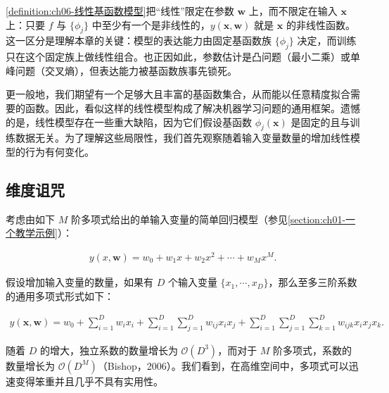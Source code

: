 \documentclass[../../main.tex]{subfiles}
\begin{document}
\begin{remark}\cref{definition:ch06-线性基函数模型}把“线性”限定在参数 $\boldsymbol{w}$ 上，而不限定在输入 $\boldsymbol{x}$ 上：只要 $f$ 与 $\{\phi_j\}$ 中至少有一个是非线性的，$y(\boldsymbol{x},\boldsymbol{w})$ 就是 $\boldsymbol{x}$ 的非线性函数。这一区分是理解本章的关键：模型的表达能力由固定基函数族 $\{\phi_j\}$ 决定，而训练只在这个固定族上做线性组合。也正因如此，参数估计是凸问题（最小二乘）或单峰问题（交叉熵），但表达能力被基函数族事先锁死。
\end{remark}

更一般地，我们期望有一个足够大且丰富的基函数集合，从而能以任意精度拟合需要的函数。因此，看似这样的线性模型构成了解决机器学习问题的通用框架。遗憾的是，线性模型存在一些重大缺陷，因为它们假设基函数 $\phi_j(\boldsymbol{x})$ 是固定的且与训练数据无关。为了理解这些局限性，我们首先观察随着输入变量数量的增加线性模型的行为有何变化。

\subsection{维度诅咒}\label{subsection:ch06-维度诅咒}

考虑由如下 $M$ 阶多项式给出的单输入变量的简单回归模型（参见\cref{section:ch01-一个教学示例}）：

\begin{align}
y(x,\boldsymbol{w})=w_0+w_1x+w_2x^{2}+\cdots+w_Mx^{M}.
\label{align:ch06-多项式一维}
\end{align}

假设增加输入变量的数量，如果有 $D$ 个输入变量 $\{x_1,\cdots,x_D\}$，那么至多三阶系数的通用多项式形式如下：

\begin{align}
y(\boldsymbol{x},\boldsymbol{w})=w_0+\sum_{i=1}^{D}w_ix_i+\sum_{i=1}^{D}\sum_{j=1}^{D}w_{ij}x_ix_j+\sum_{i=1}^{D}\sum_{j=1}^{D}\sum_{k=1}^{D}w_{ijk}x_ix_jx_k.
\label{align:ch06-多项式多维}
\end{align}

随着 $D$ 的增大，独立系数的数量增长为 $\mathcal{O}(D^{3})$，而对于 $M$ 阶多项式，系数的数量增长为 $\mathcal{O}(D^{M})$（Bishop，2006）。我们看到，在高维空间中，多项式可以迅速变得笨重并且几乎不具有实用性。
\end{document}
